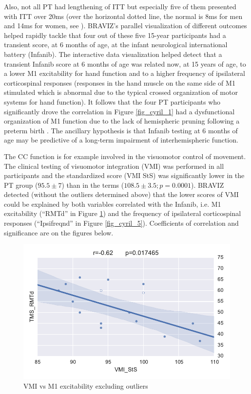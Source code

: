 \documentclass[twocolumn]{svjour3}
\begin{document}
Also, not all PT had lengthening of ITT but especially five of them presented with ITT over 20ms (over the horizontal dotted line, the normal is 8ms for men and 14ms for women, see \cite{schneider_cerebral_2012}). BRAVIZ’s parallel visualization of different outcomes helped rapidly tackle that four out of these five 15-year participants had a transient score, at 6 months of age, at the infant neurological international battery (Infanib). 
The interactive data visualization helped detect that a transient Infanib score at 6 months of age was related now, at 15 years of age, to a lower M1 excitability for hand function and to a higher frequency of ipsilateral corticospinal responses (responses in the hand muscle on the same side of M1 stimulated which is abnormal due to the typical crossed organization of motor systems for hand function). It follows that the four PT participants who significantly drove the correlation in Figure \ref{fig_cyril_1} had a dysfunctional organization of M1 function due to the lack of hemispheric pruning following a preterm birth \cite{schneider_cerebral_2012}. The ancillary hypothesis is that Infanib testing at 6 months of age may be predictive of a long-term impairment of interhemispheric function.



The CC function is for example involved in the visuomotor control of movement. The clinical testing of visuomotor integration (VMI) was performed in all participants and the standardized score (VMI StS) was significantly lower in the PT group ($95.5 \pm 7$) than in the terms ($108.5 \pm 3.5 ; p=0.0001$). 
BRAVIZ detected (without the outliers determined above) that the lower scores of VMI could be explained by both variables correlated with the Infanib, i.e. M1 excitability (``RMTd'' in Figure \ref{fig_cyril_4}) and the frequency of ipsilateral corticospinal responses (``Ipsifreqnd'' in Figure \ref{fig_cyril_5}). Coefficients of correlation and significance are on the figures below.

\begin{figure}
	\centering
		\includegraphics[width=0.9\linewidth]{cyricl_corr_1}
	\caption{VMI vs M1 excitability excluding outliers}
	\label{fig_cyril_4}
\end{figure}
\end{document}
